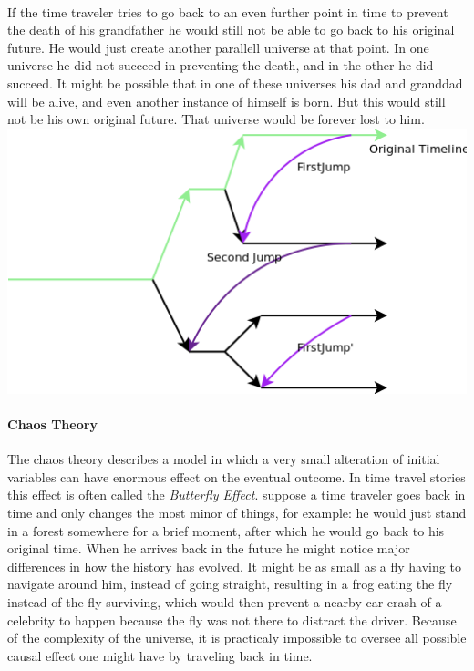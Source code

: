 \paragraph{}
If the time traveler tries to go back to an even further point in time to prevent the death of his grandfather he would still not be able to go back to his original future. He would just create another parallell universe at that point. In one universe he did not succeed in preventing the death, and in the other he did succeed. It might be possible that in one of these universes his dad and granddad will be alive, and even another instance of himself is born. But this would still not be his own original future. That universe would be forever lost to him.
\\
\includegraphics[scale=0.45]{./images/fixingit.png}

\paragraph{Chaos Theory}
The chaos theory describes a model in which a very small alteration of initial variables can have enormous effect on the eventual outcome. In time travel stories this effect is often called the \emph{Butterfly Effect}. suppose a time traveler goes back in time and only changes the most minor of things, for example: he would just stand in a forest somewhere for a brief moment, after which he would go back to his original time. When he arrives back in the future he might notice major differences in how the history has evolved. It might be as small as a fly having to navigate around him, instead of going straight, resulting in a frog eating the fly instead of the fly surviving, which would then prevent a nearby car crash of a celebrity to happen because the fly was not there to distract the driver.
Because of the complexity of the universe, it is practicaly impossible to oversee all possible causal effect one might have by traveling back in time.

